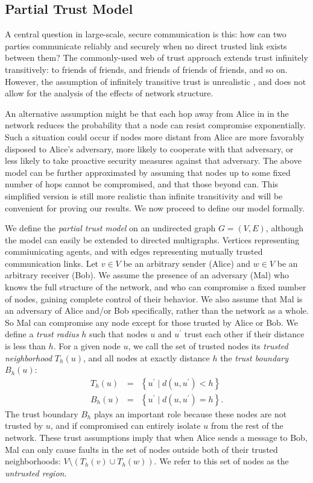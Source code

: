 \documentclass[sigconf]{acmart}
\newcommand{\beq}{\begin{eqnarray}}
\newcommand{\eeq}{\end{eqnarray}}
\begin{document}
\subsection{Partial Trust Model}

A central question in large-scale, secure communication is this:
how can two parties communicate reliably and securely
when no direct trusted link exists between them?
The commonly-used web of trust approach
\cite{zimmermann_official_1995,ferguson_practical_2003}
extends trust infinitely transitively:
to friends of friends, and friends of friends of friends, and so on.
However, the assumption of infinitely transitive trust is unrealistic
\cite{christianson_why_1997},
and does not allow for the analysis of the effects of network structure.

An alternative assumption might be that each hop away from Alice in
in the network
reduces the probability that a node can resist compromise exponentially.
Such a situation could occur if nodes more distant from Alice are
more favorably disposed to Alice's adversary, more likely to cooperate with that
adversary, or less likely to take proactive security measures against that
adversary.
The above model can be further
approximated by assuming that nodes up to some fixed number
of hops cannot be compromised, and that those beyond can.
This simplified version is still more realistic than infinite transitivity
and will be convenient for proving our results.
We now proceed to define our model formally.

We define the {\em partial trust model} on
an undirected graph $G = (V,E)$,
although the model can easily be extended to directed multigraphs.
Vertices representing commiunicating agents,
and with edges representing mutually trusted communication links.
Let $v \in V$ be an arbitrary sender (Alice)
and $w \in V$ be an arbitrary receiver (Bob).
We assume the presence of an adversary (Mal) who knows the
full structure of the network,
and who can compromise a fixed number of nodes,
gaining complete control of their behavior.
We also assume that Mal is an adversary of Alice and/or Bob specifically,
rather than the network as a whole.
So Mal can compromise any node except for those trusted by Alice or Bob.
We define a {\em trust radius} $h$ such that nodes $u$ and
$u^\prime$ trust each other if their distance is less than $h$.
For a given node $u$,
we call the set of trusted nodes its
{\em trusted neighborhood} $T_h(u)$,
and all nodes at exactly distance $h$ the
{\em trust boundary} $B_h(u)$:
\beq
T_h(u) &=& \left\{ u^\prime \mid d(u,u^\prime) < h \right\} \\
B_h(u) &=& \left\{ u^\prime \mid d(u,u^\prime) = h \right\}.
\eeq
The trust boundary $B_h$ plays an important role because these nodes are not
trusted by $u$,
and if compromised can entirely isolate $u$ from the rest of the network.
These trust assumptions imply that when Alice sends a message to Bob,
Mal can only cause faults in the set of nodes outside both of their trusted
neighborhoods: $V \setminus \left(T_h(v) \cup T_h(w)\right)$.
We refer to this set of nodes as the {\em untrusted region}.
\end{document}
